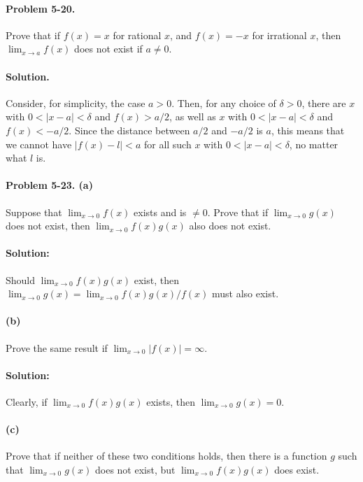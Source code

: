 \documentclass{article}
\begin{document}
\paragraph{Problem 5-20.} Prove that if $f(x) = x$ for rational $x$, and $f(x)
= -x$ for irrational $x$, then $\lim_{x \rightarrow a}f(x)$ does not exist if
$a \neq 0$.

\paragraph{Solution.} Consider, for simplicity, the case $a > 0$. Then, for any
choice of $\delta > 0$, there are $x$ with $0 < |x - a| < \delta$ and $f(x) >
a/2$, as well as $x$ with $0 < |x - a| < \delta$ and $f(x) < -a/2$. Since the
distance between $a/2$ and $-a/2$ is $a$, this means that we cannot have $|f(x)
- l| < a$ for all such $x$ with $0 < |x - a| < \delta$, no matter what $l$ is.

\paragraph{Problem 5-23. (a)} Suppose that $\lim_{x \rightarrow 0}f(x)$ exists
and is $\neq 0$. Prove that if $\lim_{x \rightarrow 0}g(x)$ does not exist,
then $\lim_{x \rightarrow 0}f(x)g(x)$ also does not exist.

\paragraph{Solution:} Should $\lim_{x \rightarrow 0}f(x)g(x)$ exist, then
$\lim_{x \rightarrow 0}g(x) = \lim_{x \rightarrow 0}f(x)g(x)/f(x)$ must also
exist.

\paragraph{(b)} Prove the same result if $\lim_{x \rightarrow 0}|f(x)|
= \infty$.

\paragraph{Solution:} Clearly, if $\lim_{x \rightarrow 0}f(x)g(x)$ exists,
then $\lim_{x \rightarrow 0}g(x) = 0$.

\paragraph{(c)} Prove that if neither of these two conditions holds, then there
is a function $g$ such that
$\lim_{x \rightarrow 0}g(x)$ does not exist, but $\lim_{x \rightarrow 0}f(x)
g(x)$ does exist.
\end{document}
